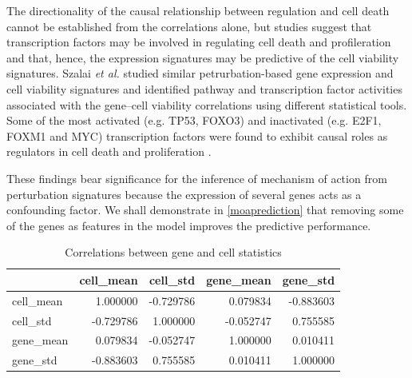 \documentclass[bsc,frontabs,twoside,singlespacing,parskip,deptreport]{infthesis}     %
\begin{document}
The directionality of the causal relationship between regulation and cell death cannot be established from the correlations alone, but studies suggest that transcription factors may be involved in regulating cell death and profileration and that, hence, the expression signatures may be predictive of the cell viability signatures. Szalai \textit{et al.} studied similar petrurbation-based gene expression and cell viability signatures and identified pathway and transcription factor activities associated with the gene–cell viability correlations using different statistical tools. Some of the most activated (e.g. TP53, FOXO3) and inactivated (e.g. E2F1, FOXM1 and MYC) transcription factors were found to exhibit causal roles as regulators in cell death and proliferation \cite{szalai_signatures_2019}.

These findings bear significance for the inference of mechanism of action from perturbation signatures because the expression of several genes acts as a confounding factor. We shall demonstrate in \ref{moaprediction} that removing some of the genes as features in the model improves the predictive performance.
\begin{table}[h!]
\centering
\begin{tabular}{lrrrr}
\toprule
{} &  cell\_mean &  cell\_std &  gene\_mean &  gene\_std \\
\midrule
cell\_mean &   1.000000 & -0.729786 &   0.079834 & -0.883603 \\
cell\_std  &  -0.729786 &  1.000000 &  -0.052747 &  0.755585 \\
gene\_mean &   0.079834 & -0.052747 &   1.000000 &  0.010411 \\
gene\_std  &  -0.883603 &  0.755585 &   0.010411 &  1.000000 \\
\bottomrule
\end{tabular}
\caption{Correlations between gene and cell statistics}\label{cell_gene_corr_table}
\end{table}
\end{document}
